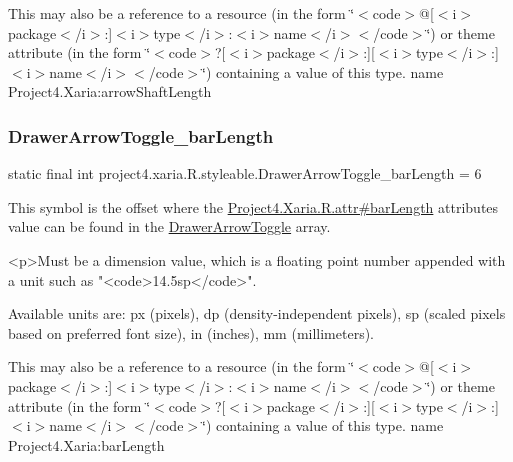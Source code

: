 This may also be a reference to a resource (in the form \char`\"{}$<$code$>$@\mbox{[}$<$i$>$package$<$/i$>$\+:\mbox{]}$<$i$>$type$<$/i$>$\+:$<$i$>$name$<$/i$>$$<$/code$>$\char`\"{}) or theme attribute (in the form \char`\"{}$<$code$>$?\mbox{[}$<$i$>$package$<$/i$>$\+:\mbox{]}\mbox{[}$<$i$>$type$<$/i$>$\+:\mbox{]}$<$i$>$name$<$/i$>$$<$/code$>$\char`\"{}) containing a value of this type.  name Project4.\+Xaria\+:arrow\+Shaft\+Length \mbox{\label{classproject4_1_1xaria_1_1R_1_1styleable_a5812c605567372cd810d538d94b94d2f}} 
\subsubsection{\texorpdfstring{Drawer\+Arrow\+Toggle\+\_\+bar\+Length}{DrawerArrowToggle\_barLength}}
{\footnotesize\ttfamily static final int project4.\+xaria.\+R.\+styleable.\+Drawer\+Arrow\+Toggle\+\_\+bar\+Length = 6\hspace{0.3cm}{\ttfamily [static]}}

This symbol is the offset where the \hyperlink{}{Project4.\+Xaria.\+R.\+attr\#bar\+Length} attribute\textquotesingle{}s value can be found in the \hyperlink{classproject4_1_1xaria_1_1R_1_1styleable_aa8594da8de0b2617c3d5cd5e028f8b77}{Drawer\+Arrow\+Toggle} array.

\begin{DoxyVerb}      <p>Must be a dimension value, which is a floating point number appended with a unit such as "<code>14.5sp</code>".
\end{DoxyVerb}
 Available units are\+: px (pixels), dp (density-\/independent pixels), sp (scaled pixels based on preferred font size), in (inches), mm (millimeters). 

This may also be a reference to a resource (in the form \char`\"{}$<$code$>$@\mbox{[}$<$i$>$package$<$/i$>$\+:\mbox{]}$<$i$>$type$<$/i$>$\+:$<$i$>$name$<$/i$>$$<$/code$>$\char`\"{}) or theme attribute (in the form \char`\"{}$<$code$>$?\mbox{[}$<$i$>$package$<$/i$>$\+:\mbox{]}\mbox{[}$<$i$>$type$<$/i$>$\+:\mbox{]}$<$i$>$name$<$/i$>$$<$/code$>$\char`\"{}) containing a value of this type.  name Project4.\+Xaria\+:bar\+Length \mbox{\label{classproject4_1_1xaria_1_1R_1_1styleable_a5ca52cb75917a6d3666d5120613e3f97}} 
